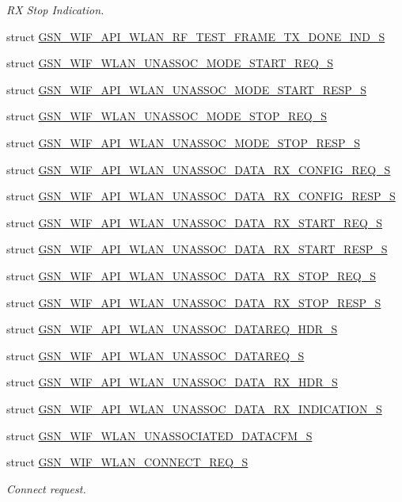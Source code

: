 \begin{DoxyCompactItemize}
\begin{DoxyCompactList}\small\item\em RX Stop Indication. \end{DoxyCompactList}\item 
struct \hyperlink{a00305}{GSN\_\-WIF\_\-API\_\-WLAN\_\-RF\_\-TEST\_\-FRAME\_\-TX\_\-DONE\_\-IND\_\-S}
\item 
struct \hyperlink{a00412}{GSN\_\-WIF\_\-WLAN\_\-UNASSOC\_\-MODE\_\-START\_\-REQ\_\-S}
\item 
struct \hyperlink{a00316}{GSN\_\-WIF\_\-API\_\-WLAN\_\-UNASSOC\_\-MODE\_\-START\_\-RESP\_\-S}
\item 
struct \hyperlink{a00413}{GSN\_\-WIF\_\-WLAN\_\-UNASSOC\_\-MODE\_\-STOP\_\-REQ\_\-S}
\item 
struct \hyperlink{a00317}{GSN\_\-WIF\_\-API\_\-WLAN\_\-UNASSOC\_\-MODE\_\-STOP\_\-RESP\_\-S}
\item 
struct \hyperlink{a00306}{GSN\_\-WIF\_\-API\_\-WLAN\_\-UNASSOC\_\-DATA\_\-RX\_\-CONFIG\_\-REQ\_\-S}
\item 
struct \hyperlink{a00307}{GSN\_\-WIF\_\-API\_\-WLAN\_\-UNASSOC\_\-DATA\_\-RX\_\-CONFIG\_\-RESP\_\-S}
\item 
struct \hyperlink{a00310}{GSN\_\-WIF\_\-API\_\-WLAN\_\-UNASSOC\_\-DATA\_\-RX\_\-START\_\-REQ\_\-S}
\item 
struct \hyperlink{a00311}{GSN\_\-WIF\_\-API\_\-WLAN\_\-UNASSOC\_\-DATA\_\-RX\_\-START\_\-RESP\_\-S}
\item 
struct \hyperlink{a00312}{GSN\_\-WIF\_\-API\_\-WLAN\_\-UNASSOC\_\-DATA\_\-RX\_\-STOP\_\-REQ\_\-S}
\item 
struct \hyperlink{a00313}{GSN\_\-WIF\_\-API\_\-WLAN\_\-UNASSOC\_\-DATA\_\-RX\_\-STOP\_\-RESP\_\-S}
\item 
struct \hyperlink{a00314}{GSN\_\-WIF\_\-API\_\-WLAN\_\-UNASSOC\_\-DATAREQ\_\-HDR\_\-S}
\item 
struct \hyperlink{a00315}{GSN\_\-WIF\_\-API\_\-WLAN\_\-UNASSOC\_\-DATAREQ\_\-S}
\item 
struct \hyperlink{a00308}{GSN\_\-WIF\_\-API\_\-WLAN\_\-UNASSOC\_\-DATA\_\-RX\_\-HDR\_\-S}
\item 
struct \hyperlink{a00309}{GSN\_\-WIF\_\-API\_\-WLAN\_\-UNASSOC\_\-DATA\_\-RX\_\-INDICATION\_\-S}
\item 
struct \hyperlink{a00414}{GSN\_\-WIF\_\-WLAN\_\-UNASSOCIATED\_\-DATACFM\_\-S}
\item 
struct \hyperlink{a00374}{GSN\_\-WIF\_\-WLAN\_\-CONNECT\_\-REQ\_\-S}
\begin{DoxyCompactList}\small\item\em Connect request. \end{DoxyCompactList}\item 

\end{DoxyCompactItemize}
